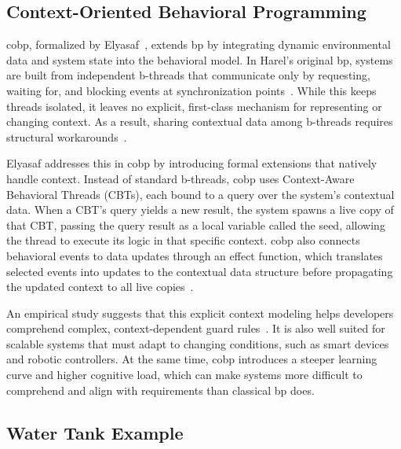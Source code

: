 \subsection{Context-Oriented Behavioral Programming}
\label{subsec:bg_bp_context-oriented}

\gls{cobp}, formalized by Elyasaf~\cite{elyasaf_context-oriented_2021}, extends \gls{bp} by integrating dynamic environmental data and system state into the behavioral model.
In Harel's original \gls{bp}, systems are built from independent b-threads that communicate only by requesting, waiting for, and blocking events at synchronization points~\cite{harel_behavioral_2012}.
While this keeps threads isolated, it leaves no explicit, first-class mechanism for representing or changing context. 
As a result, sharing contextual data among b-threads requires structural workarounds~\cite{elyasaf_context-oriented_2021}.

Elyasaf addresses this in \gls{cobp} by introducing formal extensions that natively handle context.
Instead of standard b-threads, \gls{cobp} uses Context-Aware Behavioral Threads (CBTs), each bound to a query over the system's contextual data.
When a CBT's query yields a new result, the system spawns a live copy of that CBT, passing the query result as a local variable called the seed, allowing the thread to execute its logic in that specific context.
\gls{cobp} also connects behavioral events to data updates through an effect function, which translates selected events into updates to the contextual data structure before propagating the updated context to all live copies~\cite{elyasaf_context-oriented_2021}.

An empirical study suggests that this explicit context modeling helps developers comprehend complex, context-dependent guard rules~\cite{ashrov_study_2025}.
It is also well suited for scalable systems that must adapt to changing conditions, such as smart devices and robotic controllers.
At the same time, \gls{cobp} introduces a steeper learning curve and higher cognitive load, which can make systems more difficult to comprehend and align with requirements than classical \gls{bp} does.

\subsection{Water Tank Example}
\label{subsec:bg_bp_water-tank}

